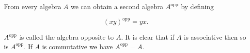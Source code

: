 From every algebra $A$ we can obtain a second algebra $A^{\text{opp}}$ by defining

$$(xy)^{\text{opp}} = yx.$$

$A^{\text{opp}}$ is called the algebra opposite to $A$. It is clear that if $A$ is associative then so is $A^{\text{opp}}$. If $A$ is commutative we have $A^{\text{opp}} = A$.
